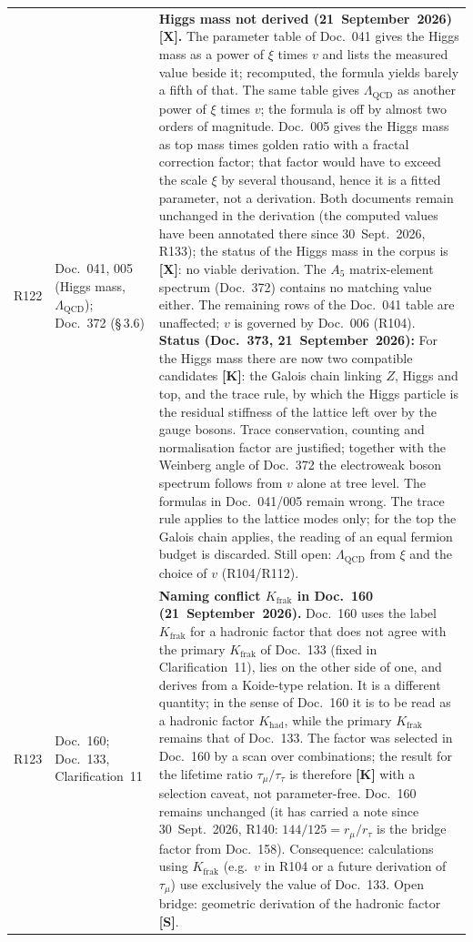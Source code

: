 \begin{longtable}{@{}p{0.9cm}p{3.1cm}p{10.2cm}@{}}
R122 & Doc.~041, 005 (Higgs mass, $\Lambda_{\mathrm{QCD}}$); Doc.~372 (§\,3.6) & \textbf{Higgs mass not derived (21~September~2026) [X].} The parameter table of Doc.~041 gives the Higgs mass as a power of $\xi$ times $v$ and lists the measured value beside it; recomputed, the formula yields barely a fifth of that. The same table gives $\Lambda_{\mathrm{QCD}}$ as another power of $\xi$ times $v$; the formula is off by almost two orders of magnitude. Doc.~005 gives the Higgs mass as top mass times golden ratio with a fractal correction factor; that factor would have to exceed the scale $\xi$ by several thousand, hence it is a fitted parameter, not a derivation. Both documents remain unchanged in the derivation (the computed values have been annotated there since 30~Sept.~2026, R133); the status of the Higgs mass in the corpus is \textbf{[X]}: no viable derivation. The $A_5$ matrix-element spectrum (Doc.~372) contains no matching value either. The remaining rows of the Doc.~041 table are unaffected; $v$ is governed by Doc.~006 (R104). \textbf{Status (Doc.~373, 21~September~2026):} For the Higgs mass there are now two compatible candidates \textbf{[K]}: the Galois chain linking $Z$, Higgs and top, and the trace rule, by which the Higgs particle is the residual stiffness of the lattice left over by the gauge bosons. Trace conservation, counting and normalisation factor are justified; together with the Weinberg angle of Doc.~372 the electroweak boson spectrum follows from $v$ alone at tree level. The formulas in Doc.~041/005 remain wrong. The trace rule applies to the lattice modes only; for the top the Galois chain applies, the reading of an equal fermion budget is discarded. Still open: $\Lambda_{\mathrm{QCD}}$ from $\xi$ and the choice of $v$ (R104/R112). \\
R123 & Doc.~160; Doc.~133, Clarification~11 & \textbf{Naming conflict $K_{\mathrm{frak}}$ in Doc.~160 (21~September~2026).} Doc.~160 uses the label $K_{\mathrm{frak}}$ for a hadronic factor that does not agree with the primary $K_{\mathrm{frak}}$ of Doc.~133 (fixed in Clarification~11), lies on the other side of one, and derives from a Koide-type relation. It is a different quantity; in the sense of Doc.~160 it is to be read as a hadronic factor $K_{\mathrm{had}}$, while the primary $K_{\mathrm{frak}}$ remains that of Doc.~133. The factor was selected in Doc.~160 by a scan over combinations; the result for the lifetime ratio $\tau_\mu/\tau_\tau$ is therefore \textbf{[K]} with a selection caveat, not parameter-free. Doc.~160 remains unchanged (it has carried a note since 30~Sept.~2026, R140: $144/125=r_\mu/r_\tau$ is the bridge factor from Doc.~158). Consequence: calculations using $K_{\mathrm{frak}}$ (e.g.\ $v$ in R104 or a future derivation of $\tau_\mu$) use exclusively the value of Doc.~133. Open bridge: geometric derivation of the hadronic factor \textbf{[S]}. \\

\end{longtable}
